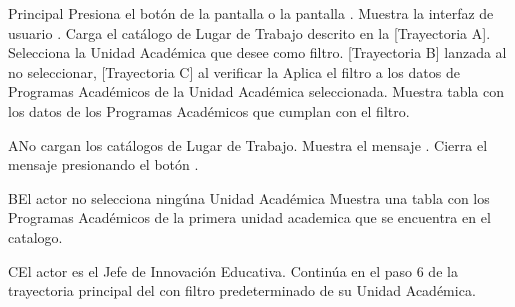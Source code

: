 \begin{UCtrayectoria}{Principal}
    \UCpaso[\UCactor] Presiona el botón  de la pantalla   o la pantalla .
    \UCpaso Muestra la interfaz de usuario .
    \UCpaso Carga el catálogo de Lugar de Trabajo descrito en la  [Trayectoria A].
    \UCpaso[\UCactor] Selecciona la Unidad Académica que desee como filtro. [Trayectoria B] lanzada al no seleccionar, [Trayectoria C] al verificar la 
    \UCpaso[\UCactor] Aplica el filtro a los datos de Programas Académicos de la Unidad Académica seleccionada.
    \UCpaso Muestra tabla con los datos de los Programas Académicos que cumplan con el filtro.
\end{UCtrayectoria}

\begin{UCtrayectoriaA}{A}{No cargan los catálogos de Lugar de Trabajo.}
    \UCpaso Muestra el mensaje .
    \UCpaso[\UCactor] Cierra el mensaje presionando el botón .
\end{UCtrayectoriaA}

\begin{UCtrayectoriaA}{B}{El actor no selecciona ningúna Unidad Académica}
    \UCpaso Muestra una tabla con los Programas Académicos de la primera unidad academica que se encuentra en el catalogo.
\end{UCtrayectoriaA}

\begin{UCtrayectoriaA}{C}{El actor es el Jefe de Innovación Educativa.}
    \UCpaso Continúa en el paso 6 de la trayectoria principal del  con filtro predeterminado de su Unidad Académica.
\end{UCtrayectoriaA}
